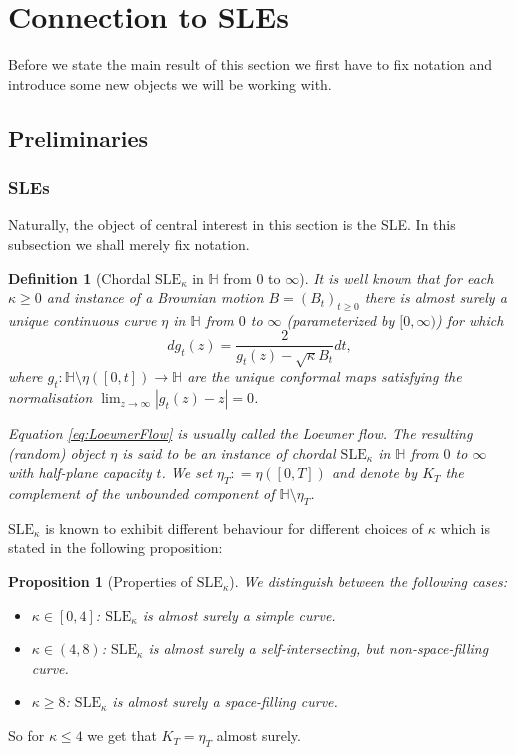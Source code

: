 \documentclass[11pt,reqno]{amsart}
\numberwithin{equation}{section}
\newtheorem{pro}[thm]{Proposition}
\newtheorem{defi}[thm]{Definition}
\newcommand{\deq}{\mathrel{\mathop:}=}
\begin{document}
\section{Connection to SLEs}
Before we state the main result of this section we first have to fix notation and introduce some new objects we will be working with.
\subsection{Preliminaries}

\subsubsection{SLEs}
Naturally, the object of central interest in this section is the SLE. In this subsection we shall merely fix notation.

\begin{defi}[Chordal $\text{SLE}_\kappa$ in $\mathbb H$ from $0$ to $\infty$]
	It is well known that for each $\kappa\geq 0$ and instance of a Brownian motion $B=(B_t)_{t\geq 0}$ there is almost surely a unique continuous curve $\eta$ in $\mathbb H$ from $0$ to $\infty$ (parameterized by $[0,\infty)$) for which
	\begin{equation}\label{eq:LoewnerFlow}
		dg_t(z)=\frac{2}{g_t(z)-\sqrt\kappa B_t}dt,
	\end{equation}
where $g_t:\mathbb H\setminus\eta([0,t])\rightarrow\mathbb H$ are the unique conformal maps satisfying the normalisation $\lim_{z\rightarrow\infty}|g_t(z)-z|=0$.

Equation \eqref{eq:LoewnerFlow} is usually called the Loewner flow. 
The resulting (random) object $\eta$ is said to be an instance of chordal $\text{SLE}_\kappa$ in $\mathbb H$ from $0$ to $\infty$ with half-plane capacity $t$.
We set $\eta_T\deq\eta([0,T])$ and denote by $K_T$ the complement of the unbounded component of $\mathbb H\setminus\eta_T$.
\end{defi}
$\text{SLE}_\kappa$ is known to exhibit different behaviour for different choices of $\kappa$ which is stated in the following proposition:
\begin{pro}[Properties of $\text{SLE}_\kappa$] We distinguish between the following cases:
	\begin{itemize}
		\item $\kappa\in[0,4]$: $\text{SLE}_\kappa$ is almost surely a simple curve.
		\item $\kappa\in(4,8)$: $\text{SLE}_\kappa$ is almost surely a self-intersecting, but non-space-filling curve.
		\item $\kappa\geq 8$: $\text{SLE}_\kappa$ is almost surely a space-filling curve.
	\end{itemize}
\end{pro}
So for $\kappa\leq 4$ we get that $K_T=\eta_T$ almost surely.
\end{document}
